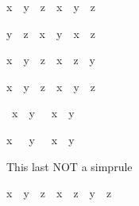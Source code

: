 \begin{isabellebody}
\begin{isamarkuptext}
\begin{isabelle}%
x\ {\isacharasterisk}\ {\isacharparenleft}y\ {\isacharslash}\ z{\isacharparenright}\ {\isacharequal}\ x\ {\isacharasterisk}\ y\ {\isacharslash}\ z%
\end{isabelle}

\begin{isabelle}%
y\ {\isacharslash}\ z\ {\isacharasterisk}\ x\ {\isacharequal}\ y\ {\isacharasterisk}\ x\ {\isacharslash}\ z%
\end{isabelle}

\begin{isabelle}%
x\ {\isacharslash}\ {\isacharparenleft}y\ {\isacharslash}\ z{\isacharparenright}\ {\isacharequal}\ x\ {\isacharasterisk}\ z\ {\isacharslash}\ y%
\end{isabelle}

\begin{isabelle}%
x\ {\isacharslash}\ y\ {\isacharslash}\ z\ {\isacharequal}\ x\ {\isacharslash}\ {\isacharparenleft}y\ {\isacharasterisk}\ z{\isacharparenright}%
\end{isabelle}

\begin{isabelle}%
{\isacharminus}\ x\ {\isacharslash}\ y\ {\isacharequal}\ {\isacharminus}\ {\isacharparenleft}x\ {\isacharslash}\ y{\isacharparenright}%
\end{isabelle}

\begin{isabelle}%
x\ {\isacharslash}\ {\isacharminus}\ y\ {\isacharequal}\ {\isacharminus}\ {\isacharparenleft}x\ {\isacharslash}\ y{\isacharparenright}%
\end{isabelle}

This last NOT a simprule

\begin{isabelle}%
{\isacharparenleft}x\ {\isacharplus}\ y{\isacharparenright}\ {\isacharslash}\ z\ {\isacharequal}\ x\ {\isacharslash}\ z\ {\isacharplus}\ y\ {\isacharslash}\ z%
\end{isabelle}
%
\end{isamarkuptext}%
\isanewline
\end{isabellebody}%
